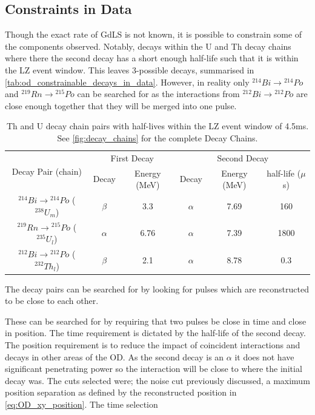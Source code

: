 \subsection{Constraints in Data}
\par
Though the exact rate of GdLS is not known, it is possible to constrain some of the components observed.
Notably, decays within the U and Th decay chains where there the second decay has a short enough half-life such that it is within the LZ event window.
This leaves 3-possible decays, summarised in \autoref{tab:od_constrainable_decays_in_data}.
However, in reality only  ${}^{214}Bi \to {}^{214}Po$ and ${}^{219}Rn \to {}^{215}Po$ can be searched for as the interactions from ${}^{212}Bi \to {}^{212}Po$ are close enough together that they will be merged into one pulse.

\begin{table}[!htbp]
    \centering
    \begin{tabular}{c|c|c|c|c|c}
        \multirow{2}{*}{Decay Pair (chain)}                    & \multicolumn{2}{c|}{First Decay}   & \multicolumn{3}{c}{Second Decay}    \\ 
                                                               & Decay    & Energy (MeV) & Decay    & Energy (MeV) & half-life ($\mu$s) \\ \hline
        ${}^{214}Bi \to {}^{214}Po$ (${}^{238}U_{m}$)          & $\beta$  & 3.3          & $\alpha$ & 7.69         & 160   \\ 
        ${}^{219}Rn \to {}^{215}Po$ (${}^{235}U_{l}$)          & $\alpha$ & 6.76         & $\alpha$ & 7.39         & 1800  \\ 
        ${}^{212}Bi \to {}^{212}Po$ (${}^{232}Th_{l}$)         & $\beta$  & 2.1          & $\alpha$ & 8.78         & 0.3
    \end{tabular}
    \caption{Th and U decay chain pairs with half-lives within the LZ event window of 4.5ms. See \autoref{fig:decay_chains} for the complete Decay Chains.}
    \label{tab:od_constrainable_decays_in_data}
\end{table}

\par
The decay pairs can be searched for by looking for pulses which are reconstructed to be close to each other.

These can be searched for by requiring that two pulses be close in time and close in position. 
The time requirement is dictated by the half-life of the second decay.
The position requirement is to reduce the impact of coincident interactions and decays in other areas of the OD.
As the second decay is an $\alpha$ it does not have significant penetrating power so the interaction will be close to where the initial decay was.
The cuts selected were; the noise cut previously discussed, a maximum position separation as defined by the reconstructed position in \autoref{eq:OD_xy_position}.
The time selection

